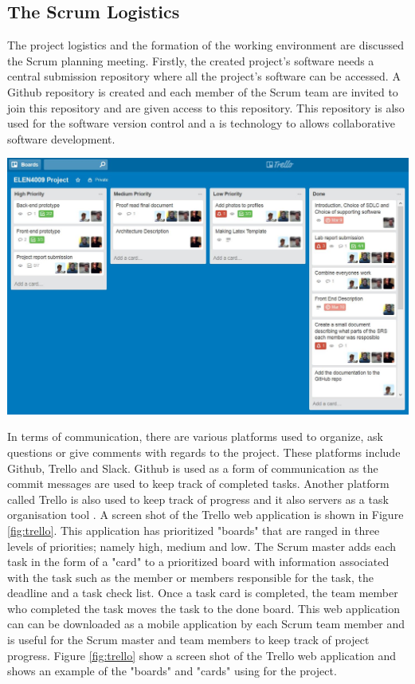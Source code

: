 \documentclass[12pt,onecolumn]{article}
\begin{document}
	\subsection{The Scrum Logistics} \label{log}
	The project logistics and the formation of the working environment are discussed the Scrum planning meeting. Firstly, the created project's software needs a central submission repository where all the project's software can be accessed. A Github repository is created and each member of the Scrum team are invited to join this repository and are given access to this repository. This repository is also used for the software version control and a is technology to allows collaborative software development.
	

	
	\begin{center}
		\includegraphics[width=\textwidth]{trello}
		 \label{fig:trello}
	\end{center}
	
	In terms of communication, there are various platforms used to organize, ask questions or give comments with regards to the project. These platforms include Github, Trello and Slack. Github is used as a form of communication as the commit messages are used to keep track of completed tasks. Another platform called Trello is also used to keep track of progress and it also servers as a task organisation tool \cite{trello}. A screen shot of the Trello web application is shown in Figure \ref{fig:trello}. This application has prioritized "boards" that are ranged in three levels of priorities; namely high, medium and low. The Scrum master adds each task in the form of a "card" to a prioritized board with information associated with the task such as the member or members responsible for the task, the deadline and a task check list. Once a task card is completed, the team member who completed the task moves the task to the done board. This web application can can be downloaded as a mobile application by each Scrum team member and is useful for the Scrum master and team members to keep track of project progress. Figure \ref{fig:trello} show a screen shot of the Trello web application and shows an example of the "boards" and "cards" using for the project.
	
\end{document}
